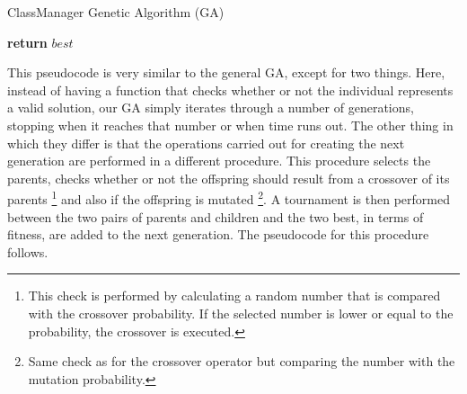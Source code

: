 \begin{algorithm}[H]
    \caption{ClassManager Genetic Algorithm (GA)}
    \begin{algorithmic}[1]
            \EndFor
            \Repeat
                    \EndIf
                \EndFor
            \State \textbf{return} $best$
        \EndProcedure
    \end{algorithmic}
\end{algorithm}

This pseudocode is very similar to the general GA, except for two things. Here, instead of having a function that checks whether or not the individual represents a valid solution, our GA simply iterates through a number of generations, stopping when it reaches that number or when time runs out. The other thing in which they differ is that the operations carried out for creating the next generation are performed in a different procedure. This procedure selects the parents, checks whether or not the offspring should result from a crossover of its parents \footnote{This check is performed by calculating a random number that is compared with the crossover probability. If the selected number is lower or equal to the probability, the crossover is executed.} and also if the offspring is mutated \footnote{Same check as for the crossover operator but comparing the number with the mutation probability.}. A tournament is then performed between the two pairs of parents and children and the two best, in terms of fitness, are added to the next generation. The pseudocode for this procedure follows.

